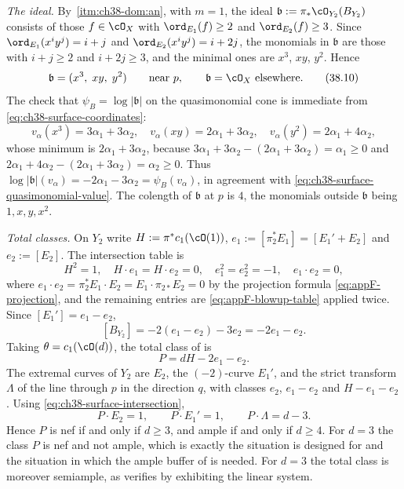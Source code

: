 \begin{example}
\emph{The ideal.}  By
\,\cref{itm:ch38-dom:an}, with
$m=1$, the ideal $\mathfrak b:=\pi_*\cO_{Y_2}(B_{Y_2})$ consists of
those $f\in\cO_X$ with $\ord_{E_1}(f)\geq2$ and
$\ord_{E_2}(f)\geq3$.  Since $\ord_{E_1}(x^iy^j)=i+j$ and
$\ord_{E_2}(x^iy^j)=i+2j$, the monomials in $\mathfrak b$ are those
with $i+j\geq2$ and $i+2j\geq3$, and the minimal ones are
$x^3$, $xy$, $y^2$.  Hence
\[
 \mathfrak b=(x^3,\;xy,\;y^2)
 \qquad\text{near }p,\qquad
 \mathfrak b=\cO_X\ \text{elsewhere}.
\tag{38.10}\label{eq:ch38-surface-ideal}
\]
The check that $\psi_B=\log|\mathfrak b|$ on the quasimonomial cone is
immediate from \eqref{eq:ch38-surface-coordinates}:
\[
 v_\alpha(x^3)=3\alpha_1+3\alpha_2,
 \quad
 v_\alpha(xy)=2\alpha_1+3\alpha_2,
 \quad
 v_\alpha(y^2)=2\alpha_1+4\alpha_2,
\]
whose minimum is $2\alpha_1+3\alpha_2$, because
$3\alpha_1+3\alpha_2-(2\alpha_1+3\alpha_2)=\alpha_1\geq0$ and
$2\alpha_1+4\alpha_2-(2\alpha_1+3\alpha_2)=\alpha_2\geq0$.  Thus
$\log|\mathfrak b|(v_\alpha)=-2\alpha_1-3\alpha_2=\psi_B(v_\alpha)$,
in agreement with \eqref{eq:ch38-surface-quasimonomial-value}.  The
colength of $\mathfrak b$ at $p$ is $4$, the monomials outside
$\mathfrak b$ being $1,x,y,x^2$.

\emph{Total classes.}  On $Y_2$ write $H:=\pi^*c_1(\cO(1))$,
$e_1:=[\pi_2^*E_1]=[E_1'+E_2]$ and $e_2:=[E_2]$.  The intersection
table is
\[
 H^2=1,\quad H\cdot e_1=H\cdot e_2=0,\quad
 e_1^2=e_2^2=-1,\quad e_1\cdot e_2=0,
\tag{38.11}\label{eq:ch38-surface-intersection}
\]
where $e_1\cdot e_2=\pi_2^*E_1\cdot E_2=E_1\cdot\pi_{2*}E_2=0$ by the
projection formula \eqref{eq:appF-projection}, and the remaining entries
are \eqref{eq:appF-blowup-table} applied twice.  Since
$[E_1']=e_1-e_2$,
\[
 [B_{Y_2}]=-2(e_1-e_2)-3e_2=-2e_1-e_2 .
\]
Taking $\theta=c_1(\cO(d))$, the total class of
 is
\[
 P=dH-2e_1-e_2 .
\tag{38.12}\label{eq:ch38-surface-total}
\]
The extremal curves of $Y_2$ are $E_2$, the $(-2)$-curve $E_1'$,
and the strict transform $\Lambda$ of the line through $p$ in the
direction $q$, with classes $e_2$, $e_1-e_2$ and
$H-e_1-e_2$.  Using \eqref{eq:ch38-surface-intersection},
\[
 P\cdot E_2=1,\qquad
 P\cdot E_1'=1,\qquad
 P\cdot\Lambda=d-3 .
\tag{38.13}\label{eq:ch38-surface-nef-test}
\]
Hence $P$ is nef if and only if $d\geq3$, and ample if and only if
$d\geq4$.  For $d=3$ the class $P$ is nef and not ample, which is
exactly the situation  is designed
for and the situation in which the ample buffer of
 is needed.  For $d=3$ the total class is
moreover semiample, as  verifies
by exhibiting the linear system.
\end{example}


